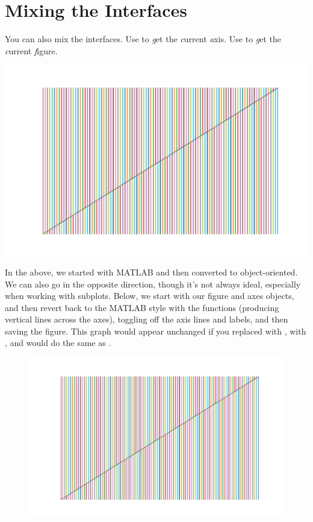 \section{Mixing the Interfaces}

You can also mix the interfaces. Use  to \emph{g}et the \emph{c}urrent \emph{a}xis. Use  to \emph{g}et the \emph{c}urrent \emph{f}igure.



\begin{center}
    \includegraphics[width = .8\textwidth]{figures/proseplots/chart.pdf}
\end{center}


In the above, we started with MATLAB and then converted to object-oriented. We can also go in the opposite direction, though it's not always ideal, especially when working with subplots. Below, we start with our figure and axes objects, and then revert back to the MATLAB style with the  functions (producing vertical lines across the axes), toggling off the axis lines and labels, and then saving the figure. This graph would appear unchanged if you replaced  with ,  with , and  would do the same as .


\begin{figure}
    \centering
    \includegraphics[width = .8\textwidth]{figures/proseplots/colorful.pdf}    %
    \label{fig:my_label}
\end{figure}


